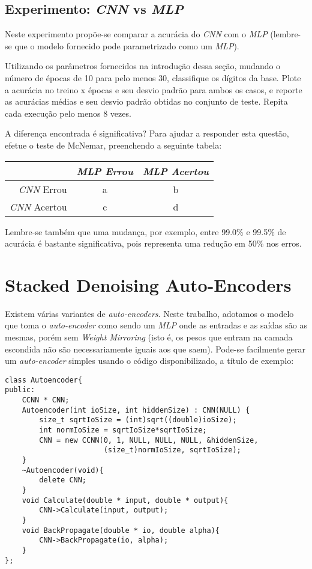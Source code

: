 \documentclass[12pt, a4paper]{article}
\begin{document}
\subsection{Experimento: \emph{CNN} vs \emph{MLP}}

Neste experimento propõe-se comparar a acurácia do \emph{CNN} com o \emph{MLP} (lembre-se que o modelo fornecido pode parametrizado como um \emph{MLP}).

Utilizando os parâmetros fornecidos na introdução dessa seção, mudando o número de épocas de 10 para pelo menos 30, classifique os dígitos da base. Plote a acurácia no treino x épocas e seu desvio padrão para ambos os casos, e reporte as acurácias médias e seu desvio padrão obtidas no conjunto de teste. Repita cada execução pelo menos 8 vezes.

A diferença encontrada é significativa? Para ajudar a responder esta questão, efetue o teste de McNemar, preenchendo a seguinte tabela:

\begin{center}
\begin{tabular}{r | c c}
                   & \emph{MLP Errou} & \emph{MLP Acertou} \\
\hline
\emph{CNN} Errou   &         a        &         b          \\
\emph{CNN} Acertou &         c        &         d          \\
\end{tabular}
\end{center}

Lembre-se também que uma mudança, por exemplo, entre 99.0\% e 99.5\% de acurácia é bastante significativa, pois representa uma redução em 50\% nos erros.

\section{Stacked Denoising Auto-Encoders}

Existem várias variantes de \emph{auto-encoders}. Neste trabalho, adotamos o modelo que toma o \emph{auto-encoder} como sendo um \emph{MLP} onde as entradas e as saídas são as mesmas, porém sem \emph{Weight Mirroring} (isto é, os pesos que entram na camada escondida não são necessariamente iguais aos que saem). Pode-se facilmente gerar um \emph{auto-encoder} simples usando o código disponibilizado, a título de exemplo:

\begin{verbatim}
class Autoencoder{
public:
    CCNN * CNN;
    Autoencoder(int ioSize, int hiddenSize) : CNN(NULL) {
        size_t sqrtIoSize = (int)sqrt((double)ioSize);
        int normIoSize = sqrtIoSize*sqrtIoSize;
        CNN = new CCNN(0, 1, NULL, NULL, NULL, &hiddenSize, 
                       (size_t)normIoSize, sqrtIoSize);
    }
    ~Autoencoder(void){
        delete CNN;
    }
    void Calculate(double * input, double * output){
        CNN->Calculate(input, output);
    }
    void BackPropagate(double * io, double alpha){
        CNN->BackPropagate(io, alpha);
    }
};
\end{verbatim}
\end{document}
